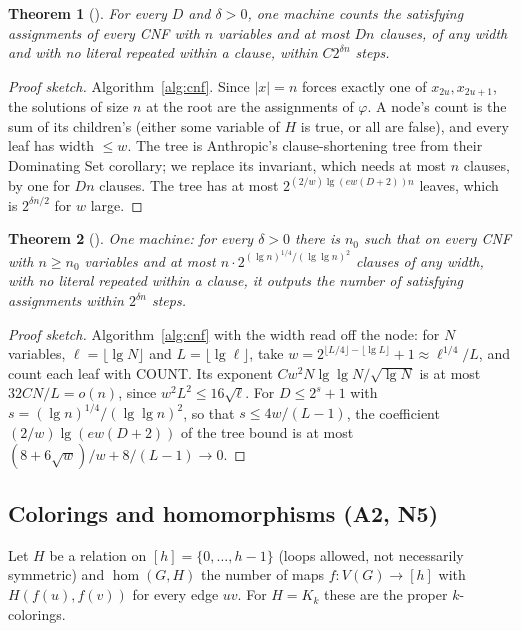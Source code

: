 \documentclass[11pt]{article}
\newtheorem{theorem}{Theorem}
\theoremstyle{remark}
\newcommand{\lean}[1]{\texttt{\detokenize{#1}}}
\newcommand{\COUNT}{\textsf{COUNT}}
\begin{document}
\begin{theorem}[\lean{cnf_counts}]
For every $D$ and $\delta>0$, one machine counts the satisfying assignments of every CNF with $n$
variables and at most $Dn$ clauses, of any width and with no literal repeated within a clause, within
$C2^{\delta n}$ steps.
\end{theorem}

\begin{proof}[Proof sketch]
Algorithm~\ref{alg:cnf}. Since $|x|=n$ forces exactly one of $x_{2u},x_{2u+1}$, the solutions of size
$n$ at the root are the assignments of $\varphi$. A node's count is the sum of its children's
(either some variable of $H$ is true, or all are false), and every leaf has width $\le w$. The tree is
Anthropic's clause-shortening tree from their Dominating Set corollary; we replace its invariant,
which needs at most $n$ clauses, by one for $Dn$ clauses. The tree has at most
$2^{(2/w)\lg(ew(D+2))n}$ leaves, which is $2^{\delta n/2}$ for $w$ large.
\end{proof}

\begin{theorem}[\lean{cnf_grow}]
One machine: for every $\delta>0$ there is $n_0$ such that on every CNF with $n\ge n_0$ variables and
at most $n\cdot 2^{(\lg n)^{1/4}/(\lg\lg n)^2}$ clauses of any width, with no literal repeated
within a clause, it outputs the number of satisfying assignments within $2^{\delta n}$ steps.
\end{theorem}

\begin{proof}[Proof sketch]
Algorithm~\ref{alg:cnf} with the width read off the node: for $N$ variables, $\ell=\lfloor\lg
N\rfloor$ and $L=\lfloor\lg\ell\rfloor$, take $w=2^{\lfloor L/4\rfloor-\lfloor\lg L\rfloor}+1\approx
\ell^{1/4}/L$, and count each leaf with \COUNT. Its exponent $Cw^2N\lg\lg N/\sqrt{\lg N}$ is at most
$32CN/L=o(n)$, since $w^2L^2\le16\sqrt\ell$. For $D\le2^s+1$ with $s=(\lg n)^{1/4}/(\lg\lg n)^2$, so
that $s\le4w/(L-1)$, the coefficient $(2/w)\lg(ew(D+2))$ of the tree bound is
at most $(8+6\sqrt w)/w+8/(L-1)\to0$.
\end{proof}

\subsection{Colorings and homomorphisms (A2, N5)}

Let $H$ be a relation on $[h]=\{0,\dots,h-1\}$ (loops allowed, not necessarily symmetric) and
$\hom(G,H)$ the number of maps $f:V(G)\to[h]$ with $H(f(u),f(v))$ for every edge $uv$. For
$H=K_k$ these are the proper $k$-colorings.
\end{document}
